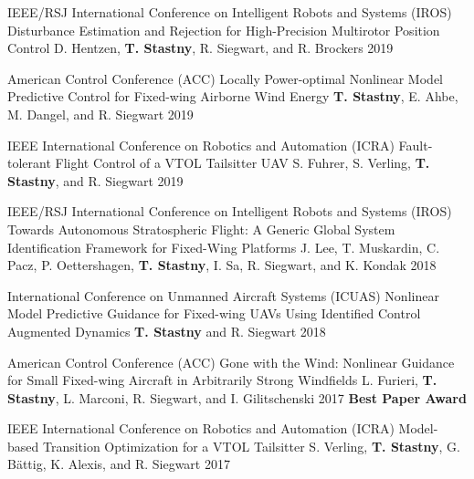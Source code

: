 \begin{cventries}
\cvpubentry
	{IEEE/RSJ International Conference on Intelligent Robots and Systems (IROS)} %
	{Disturbance Estimation and Rejection for High-Precision Multirotor Position Control} %
	{D. Hentzen, \textbf{T. Stastny}, R. Siegwart, and R. Brockers} %
	{} %
	{2019} %
	{} %
	{} %

\cvpubentry
	{American Control Conference (ACC)} %
	{Locally Power-optimal Nonlinear Model Predictive Control for Fixed-wing Airborne Wind Energy} %
	{\textbf{T. Stastny}, E. Ahbe, M. Dangel, and R. Siegwart} %
	{} %
	{2019} %
	{} %
	{} %

\cvpubentry
	{IEEE International Conference on Robotics and Automation (ICRA)} %
	{Fault-tolerant Flight Control of a VTOL Tailsitter UAV} %
	{S. Fuhrer, S. Verling, \textbf{T. Stastny}, and R. Siegwart} %
	{} %
	{2019} %
	{} %
	{} %

\cvpubentry
	{IEEE/RSJ International Conference on Intelligent Robots and Systems (IROS)} %
	{Towards Autonomous Stratospheric Flight: A Generic Global System Identification Framework for Fixed-Wing Platforms} %
	{J. Lee, T. Muskardin, C. Pacz, P. Oettershagen, \textbf{T. Stastny}, I. Sa, R. Siegwart, and K. Kondak} %
	{} %
	{2018} %
	{} %
	{} %

\cvpubentry
	{International Conference on Unmanned Aircraft Systems (ICUAS)} %
	{Nonlinear Model Predictive Guidance for Fixed-wing UAVs Using Identified Control Augmented Dynamics} %
	{\textbf{T. Stastny} and R. Siegwart} %
	{} %
	{2018} %
	{} %
	{} %

\cvpubentry
	{American Control Conference (ACC)} %
	{Gone with the Wind: Nonlinear Guidance for Small Fixed-wing Aircraft in Arbitrarily Strong Windfields} %
	{L. Furieri, \textbf{T. Stastny}, L. Marconi, R. Siegwart, and I. Gilitschenski} %
	{} %
	{2017} %
	{} %
	{\textbf{Best Paper Award}} %
	
\cvpubentry
	{IEEE International Conference on Robotics and Automation (ICRA)} %
	{Model-based Transition Optimization for a VTOL Tailsitter} %
	{S. Verling, \textbf{T. Stastny}, G. B{\"a}ttig, K. Alexis, and R. Siegwart} %
	{} %
	{2017} %
	{} %
	{} %
	

\end{cventries}
